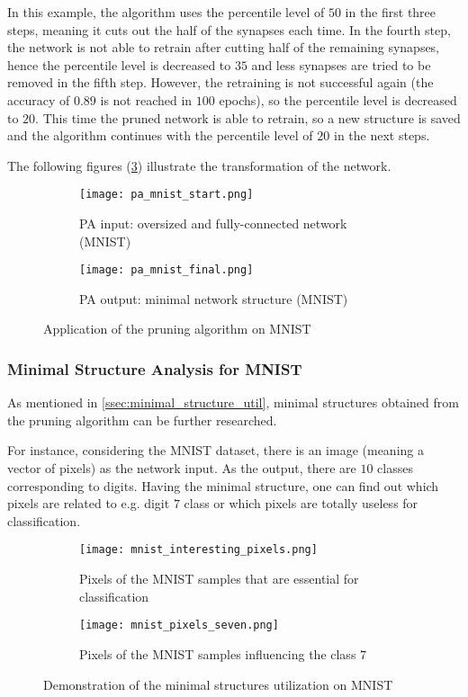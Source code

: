 In this example, the algorithm uses the percentile level of $ 50 $ in the first three steps, meaning it cuts out the half of the synapses each time. In the fourth step, the network is not able to retrain after cutting half of the remaining synapses, hence the percentile level is decreased to $ 35 $ and less synapses are tried to be removed in the fifth step. However, the retraining is not successful again (the accuracy of $ 0.89 $ is not reached in $ 100 $ epochs), so the percentile level is decreased to $ 20 $. This time the pruned network is able to retrain, so a new structure is saved and the algorithm continues with the percentile level of $ 20 $ in the next steps.

The following figures (\ref{img:pa_mnist_morph}) illustrate the transformation of the network.
\begin{figure}[H]
\centering
\begin{subfigure}{0.45\textwidth}
  \centering
  \texttt{[image: pa\_mnist\_start.png]}
  \caption{PA input: oversized and fully-connected network (MNIST)}
  \label{img:pa_mnist_start}
\end{subfigure}%
\begin{subfigure}{0.45\textwidth}
  \centering
  \texttt{[image: pa\_mnist\_final.png]}
  \caption{PA output: minimal network structure (MNIST)}
  \label{img:pa_mnist_final}
\end{subfigure}
\caption{Application of the pruning algorithm on MNIST}
\label{img:pa_mnist_morph}
\end{figure}

\subsubsection{Minimal Structure Analysis for MNIST} \label{sssec:mnist_analysis}
As mentioned in \cref{ssec:minimal_structure_util}, minimal structures obtained from the pruning algorithm can be further researched.

For instance, considering the MNIST dataset, there is an image (meaning a vector of pixels) as the network input. As the output, there are $ 10 $ classes corresponding to digits. Having the minimal structure, one can find out which pixels are related to e.g. digit $ 7 $ class or which pixels are totally useless for classification.

\begin{figure}[H]
\centering
\begin{subfigure}{0.45\textwidth}
  \centering
  \texttt{[image: mnist\_interesting\_pixels.png]}
  \caption{Pixels of the MNIST samples that are essential for classification}
  \label{img:msu_interesting}
\end{subfigure}%
\begin{subfigure}{0.45\textwidth}
  \centering
  \texttt{[image: mnist\_pixels\_seven.png]}
  \caption{Pixels of the MNIST samples influencing the class $ 7 $}
  \label{img:msu_seven}
\end{subfigure}
\caption{Demonstration of the minimal structures utilization on MNIST}
\label{img:pa_xor_morph}
\end{figure}

